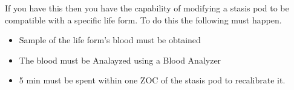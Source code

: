\documentclass[green]{guildcamp4}
\begin{document}
\name{\gModStasis{}}

If you have this then you have the capability of modifying a stasis pod to be compatible with a specific life form. To do this the following must happen.

\begin{itemize}
	\item Sample of the life form's blood must be obtained
	\item The blood must be Analayzed using a Blood Analyzer
	\item 5 min must be spent within one ZOC of the stasis pod to recalibrate it.
\end{itemize}
\end{document}
